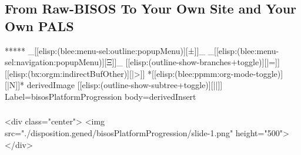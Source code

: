 \begin{whenOrg}
\section{From Raw-BISOS To Your Own Site and Your Own PALS}


\begin{whenOrg}
*****  _[[elisp:(blee:menu-sel:outline:popupMenu)][±]]_ _[[elisp:(blee:menu-sel:navigation:popupMenu)][Ξ]]_ [[elisp:(outline-show-branches+toggle)][|=]] [[elisp:(bx:orgm:indirectBufOther)][|>]] *[[elisp:(blee:ppmm:org-mode-toggle)][|N]]*  derivedImage [[elisp:(outline-show-subtree+toggle)][||]] Label=bisosPlatformProgression  body=derivedInsert
\end{whenOrg}

\begin{htmlonly}

\begin{frame}[fragile,plain,label=bisosPlatformProgression]
    \frametitle{}
    \framesubtitle{}
    \begin{rawhtml}
<div class="center">
<img src="./disposition.gened/bisosPlatformProgression/slide-1.png" height="500">
</div>
    \end{rawhtml}
\end{frame}
\end{htmlonly}

\begin{verblatex}

\begin{frame}[fragile,plain,label=bisosPlatformProgression]
    \frametitle{}
    \framesubtitle{}

\end{frame}
\end{verblatex}
\end{whenOrg}
